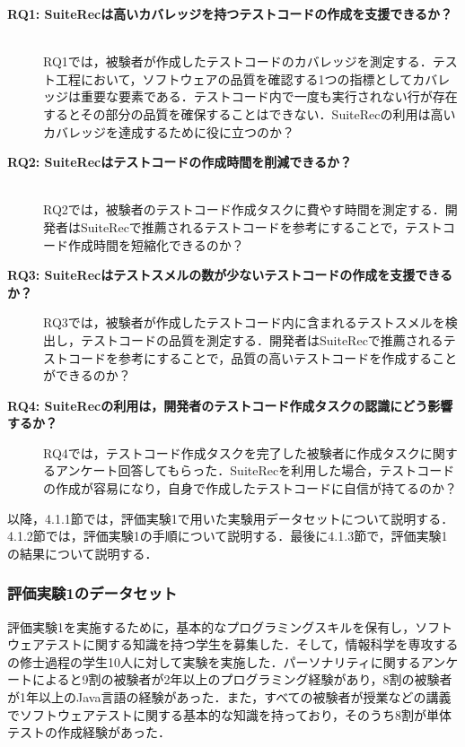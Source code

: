 \documentclass[12pt]{jarticle} %
\begin{document}
\begin{description}
\item[\textbf{RQ1: {\sf SuiteRec}は高いカバレッジを持つテストコードの作成を支援できるか？}]~\\
RQ1では，被験者が作成したテストコードのカバレッジを測定する．テスト工程において，ソフトウェアの品質を確認する1つの指標としてカバレッジは重要な要素である．テストコード内で一度も実行されない行が存在するとその部分の品質を確保することはできない．{\sf SuiteRec}の利用は高いカバレッジを達成するために役に立つのか？
\item[\textbf{RQ2: {\sf SuiteRec}はテストコードの作成時間を削減できるか？}]~\\
RQ2では，被験者のテストコード作成タスクに費やす時間を測定する．開発者は{\sf SuiteRec}で推薦されるテストコードを参考にすることで，テストコード作成時間を短縮化できるのか？
\item[\textbf{RQ3: {\sf SuiteRec}はテストスメルの数が少ないテストコードの作成を支援できるか？}]
RQ3では，被験者が作成したテストコード内に含まれるテストスメルを検出し，テストコードの品質を測定する．開発者は{\sf SuiteRec}で推薦されるテストコードを参考にすることで，品質の高いテストコードを作成することができるのか？
\item[\textbf{RQ4: {\sf SuiteRec}の利用は，開発者のテストコード作成タスクの認識にどう影響するか？}]
RQ4では，テストコード作成タスクを完了した被験者に作成タスクに関するアンケート回答してもらった．{\sf SuiteRec}を利用した場合，テストコードの作成が容易になり，自身で作成したテストコードに自信が持てるのか？
\end{description}

以降，4.1.1節では，評価実験1で用いた実験用データセットについて説明する．4.1.2節では，評価実験1の手順について説明する．最後に4.1.3節で，評価実験1の結果について説明する．


\subsubsection{評価実験1のデータセット}
\label{sec:E1data}

評価実験1を実施するために，基本的なプログラミングスキルを保有し，ソフトウェアテストに関する知識を持つ学生を募集した．そして，情報科学を専攻するの修士過程の学生10人に対して実験を実施した．パーソナリティに関するアンケートによると9割の被験者が2年以上のプログラミング経験があり，8割の被験者が1年以上のJava言語の経験があった．また，すべての被験者が授業などの講義でソフトウェアテストに関する基本的な知識を持っており，そのうち8割が単体テストの作成経験があった．
\end{document}
